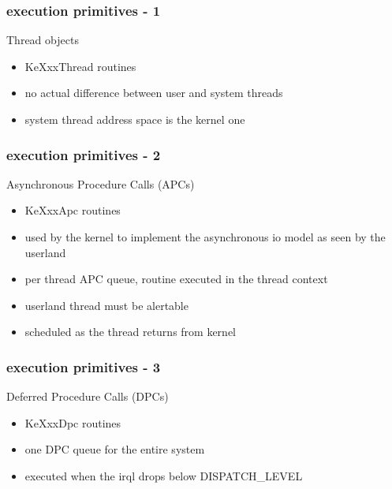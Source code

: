 
\begin{frame}
 \frametitle{execution primitives - 1}

 Thread objects

 \begin{itemize}
  \item KeXxxThread routines
  \item no actual difference between user and system threads
  \item system thread address space is the kernel one
 \end{itemize}

\end{frame}


\begin{frame}
 \frametitle{execution primitives - 2}

 Asynchronous Procedure Calls (APCs)

 \begin{itemize}
  \item KeXxxApc routines
  \item used by the kernel to implement the asynchronous io model as seen by the userland
  \item per thread APC queue, routine executed in the thread context
  \item userland thread must be alertable
  \item scheduled as the thread returns from kernel
 \end{itemize}

\end{frame}


\begin{frame}
 \frametitle{execution primitives - 3}

 Deferred Procedure Calls (DPCs)

 \begin{itemize}
  \item KeXxxDpc routines
  \item one DPC queue for the entire system
  \item executed when the irql drops below DISPATCH\_LEVEL
 \end{itemize}

\end{frame}


